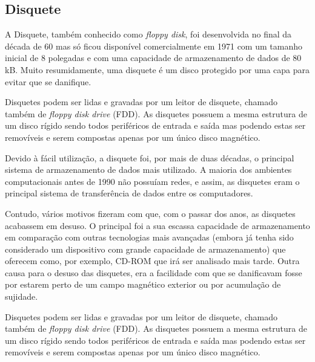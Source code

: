 \documentclass{report}
\begin{document}
\newpage

		\subsection{Disquete}
		A Disquete, também conhecido como \textit{floppy disk}, foi desenvolvida no final da década de 60 mas só ficou disponível comercialmente em 1971 com um tamanho inicial de 8 polegadas e com uma capacidade de armazenamento de dados de 80 kB. Muito resumidamente, uma disquete é um disco protegido por uma capa para evitar que se danifique. 
\vspace{1mm}

		Disquetes podem ser lidas e gravadas por um leitor de disquete, chamado também de \textit{floppy disk drive} (FDD). As disquetes possuem a mesma estrutura de um disco rígido sendo todos periféricos de entrada e saída mas podendo estas ser removíveis e serem compostas apenas por um único disco magnético.
\vspace{1mm}
		
		 Devido à fácil utilização, a disquete foi, por mais de duas décadas, o principal sistema de armazenamento de dados mais utilizado. A maioria dos ambientes computacionais antes de 1990 não possuíam redes, e assim, as disquetes eram o principal sistema de transferência de dados entre os computadores.
\vspace{1mm}
		
		Contudo, vários motivos fizeram com que, com o passar dos anos, as disquetes acabassem em desuso. O principal foi a sua escassa capacidade de armazenamento em comparação com outras tecnologias mais avançadas (embora já tenha sido considerado um dispositivo com grande capacidade de armazenamento) que oferecem como, por exemplo, CD-ROM que irá ser analisado mais tarde. Outra causa para o desuso das disquetes, era a facilidade com que se danificavam fosse por estarem perto de um campo magnético exterior ou por acumulação de sujidade.
\vspace{1mm}
	
		Disquetes podem ser lidas e gravadas por um leitor de disquete, chamado também de \textit{floppy disk drive} (FDD). As disquetes possuem a mesma estrutura de um disco rígido sendo todos periféricos de entrada e saída mas podendo estas ser removíveis e serem compostas apenas por um único disco magnético.
\vspace{1mm}
		
\end{document}
